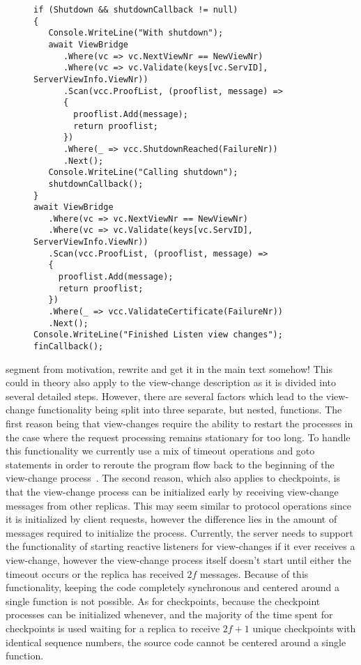 \begin{figure}[H]
	\centering
	\begin{lstlisting}[label = code:viewListener, caption=Source code for View-Change Listener, captionpos = b, basicstyle=\scriptsize]
if (Shutdown && shutdownCallback != null)
{
   Console.WriteLine("With shutdown");
   await ViewBridge
      .Where(vc => vc.NextViewNr == NewViewNr)
      .Where(vc => vc.Validate(keys[vc.ServID], ServerViewInfo.ViewNr))
      .Scan(vcc.ProofList, (prooflist, message) =>
      {
        prooflist.Add(message);
        return prooflist;
      })
      .Where(_ => vcc.ShutdownReached(FailureNr))
      .Next();
   Console.WriteLine("Calling shutdown");
   shutdownCallback();
}
await ViewBridge
   .Where(vc => vc.NextViewNr == NewViewNr)
   .Where(vc => vc.Validate(keys[vc.ServID], ServerViewInfo.ViewNr))
   .Scan(vcc.ProofList, (prooflist, message) =>
   {
     prooflist.Add(message);
     return prooflist;
   })
   .Where(_ => vcc.ValidateCertificate(FailureNr))
   .Next();
Console.WriteLine("Finished Listen view changes");
finCallback();
    \end{lstlisting}
\end{figure} 
segment from motivation, rewrite and get it in the main text somehow!
This could in theory also apply to the view-change description as it is divided into several detailed steps. However, there are several factors which lead to the view-change functionality being split into three separate, but nested, functions. The first reason being that view-changes require the ability to restart the processes in the case where the request processing remains stationary for too long. To handle this functionality we currently use a mix of timeout operations and goto statements in order to reroute the program flow back to the beginning of the view-change process~\cite{WEB:goto}. The second reason, which also applies to checkpoints, is that the view-change process can be initialized early by receiving view-change messages from other replicas. This may seem similar to protocol operations since it is initialized by client requests, however the difference lies in the amount of messages required to initialize the process. Currently, the server needs to support the functionality of starting reactive listeners for view-changes if it ever receives a view-change, however the view-change process itself doesn't start until either the timeout occurs or the replica has received $2f$ messages. Because of this functionality, keeping the code completely synchronous and centered around a single function is not possible. As for checkpoints, because the checkpoint processes can be initialized whenever, and the majority of the time spent for checkpoints is used waiting for a replica to receive $2f+1$ unique checkpoints with identical sequence numbers, the source code cannot be centered around a single function.
\fi


